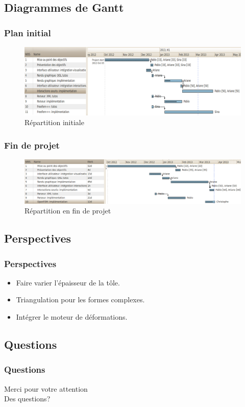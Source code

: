 \documentclass{beamer}
\begin{document}
\subsection{Diagrammes de Gantt}
\begin{frame}
    \frametitle{Plan initial}
    \begin{figure}
        \includegraphics[width=\textwidth]{img/gantt.png}
        \caption{Répartition initiale}
    \end{figure}
\end{frame}
\begin{frame}
    \frametitle{Fin de projet}
    \begin{figure}
        \includegraphics[width=\textwidth]{img/ganttFin.png}
        \caption{Répartition en fin de projet}
    \end{figure}
\end{frame}
\subsection{Perspectives}
\begin{frame}
    \frametitle{Perspectives}
    \begin{itemize}
        \item Faire varier l'épaisseur de la tôle.
        \item Triangulation pour les formes complexes.
        \item Intégrer le moteur de déformations.
    \end{itemize}
\end{frame}
\subsection{Questions}
\begin{frame}
    \frametitle{Questions}
    Merci pour votre attention\\[3.5cm]
    \hfill Des questions?
\end{frame}
\end{document}
